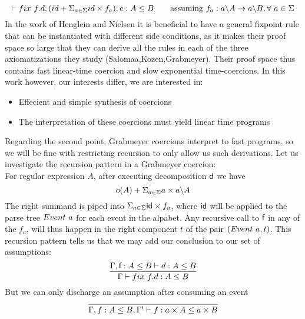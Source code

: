 \documentclass[a4paper,UKenglish,cleveref, autoref, thm-restate]{lipics-v2021}
\newcommand\mycomment[1]{}
\begin{document}
\[
\contains{}{\fix ~f.d;(id + \Sigma_{a \in \Sigma} id\times f_a); e}{A}{B} \qquad \text{assuming }f_a : \derive{a}{A} \rightarrow \derive{a}{B}, \forall ~ a \in \Sigma \]
In the work of Henglein and Nielsen it is beneficial to have a general fixpoint rule that can be instantiated with different side conditions, as it makes their proof space so large that they can derive all the rules in each of the three axiomatizations they study (Salomaa,Kozen,Grabmeyer). Their proof space thus contains fast linear-time coercion and slow exponential time-coercions. In this work however, our interests differ, we are interested in:
\begin{itemize}
\item Effecient and simple synthesis of coercions
\item The interpretation of these coercions must yield linear time programs \mycomment{sparse parsetrees might have slower runtime?}
\end{itemize}
Regarding the second point, Grabmeyer coercions interpret to fast programs, so we will be fine with restricting recursion to only allow us such derivations. Let us investigate the recursion pattern in a Grabmeyer coercion:\\
For regular expression $A$, after executing decomposition $\textsf{d}$ we have 
 \[ o(A) + \Sigma_{a \in \Sigma} a\times a \backslash A \]
 The right summand is piped into $\Sigma_{a \in \Sigma} \textsf{id}\times f_a$, where $\textsf{id}$ will be applied to the parse tree $\event{a}$ for each event in the alpabet. Any recursive call to $\textsf{f}$ in any of the $f_a$, will thus happen in the right component $t$ of the pair $(\event{a},t)$. 
This recursion pattern tells us that we may add our conclusion to our set of assumptions:
\[\infer{\contains{\Gamma}{\fix ~f.d}{A}{B}}{ \contains{\Gamma, \dslcom{f}: A \leq B}{d}{A}{B}}
\]
But we can only discharge an assumption after consuming an event
\[\infer{\contains{\Gamma, f : A \leq B, \Gamma'}{f}{a \times A}{a \times B}}{}
\]
\end{document}
